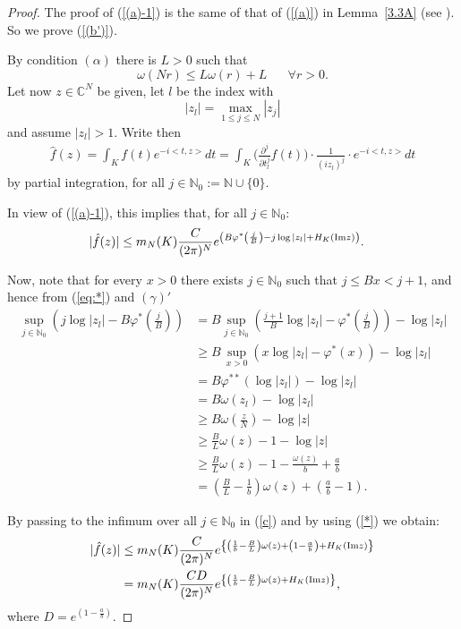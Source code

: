 \documentclass[twoside]{amsart}
\begin{document}
\begin{proof}
  The proof of (\ref{(a)-1}) is the same of that of (\ref{(a)}) in
  Lemma~\ref{3.3A} (see \cite[Lemma~3.3]{BMT}).
So we prove (\ref{(b')}).

By condition $(\alpha)$ there is $L>0$ such that 
\begin{equation}
\omega(Nr)\leq L\omega(r)+L\,\,\,\,\,\,\,\,\,\,\forall r>0.
\label{eq:*}
\end{equation}
Let now $z\in\mathbb{C}^{N}$ be given, let $l$ be the index with
\[
|z_{l}|=\underset{1\leq j\leq N}{\max}|z_{j}|
\]
and assume $|z_{l}|>1$.
Write then
\begin{align*}
\hat{f}(z) =\int_{K}f(t)e^{-i<t,z>}dt
 =\int_{K}\bigg(\frac{\partial^{j}}{\partial t_{l}^{j}}f(t)\bigg)
\cdot\frac{1}{(iz_{l})^{j}}\cdot e^{-i<t,z>}dt
\end{align*}
by partial integration, for all $j\in\mathbb{N}_{0}:={\mathbb N}\cup\{0\}$.

In view of (\ref{(a)-1}), this implies that, for all $j\in\mathbb{N}_{0}$:
\begin{align}
|\hat{f}(z)| & \leq m_{N}(K)\frac{C}{(2\pi)^{N}}
e^{\left(B\varphi^{*}\left(\frac{j}{B}\right)-j\log|z_{l}|+H_{K}({\mathop{\rm Im}\nolimits} z)\right)}.
\label{c}
\end{align}

Now, note that for every $x>0$ there exists $j\in{\mathbb N}_{0}$ such that
$j\leq Bx<j+1$, and hence from (\ref{eq:*}) and $(\gamma)'$
\begin{align}
\underset{j\in\mathbb{N}_{0}}{\sup}\left(j\log|z_{l}|-B
\varphi^{*}\left(\frac{j}{B}\right)\right) & =
B\underset{j\in\mathbb{N}_{0}}{\sup}\left(\frac{j+1}{B}
\log|z_{l}|-\varphi^{*}\left(\frac{j}{B}\right)\right)-\log|z_{l}|\nonumber \\
 & \geq B\,\underset{x>0}{\sup}\left(x\log|z_{l}|-\varphi^{*}(x)\right)-
\log|z_{l}|\nonumber \\
 & =B\varphi^{**}\left(\log|z_{l}|\right)-\log|z_{l}|\nonumber \\
 & =B\omega(z_{l})-\log|z_{l}|\nonumber \\
 & \geq B\omega\left(\frac{z}{N}\right)-\log|z|\nonumber \\
 & \geq\frac{B}{L}\omega(z)-1-\log|z|\nonumber \\
 & \geq\frac{B}{L}\omega(z)-1-\frac{\omega(z)}{b}+\frac{a}{b}\nonumber \\
 & =\left(\frac{B}{L}-\frac{1}{b}\right)\omega(z)+\left(\frac{a}{b}-1\right).
\label{*}
\end{align}

By passing to the infimum over all $j\in\mathbb{N}_{0}$ in (\ref{c})
and by using (\ref{*}) we obtain:
\begin{align*}
|\hat{f}(z)| & \leq{\displaystyle m_{N}(K)\frac{C}{(2\pi)^{N}}
e^{\left\{ \left(\frac{1}{b}-\frac{B}{L}\right)\omega(z)+\left(1-\frac{a}{b}\right)
+H_{K}({\mathop{\rm Im}\nolimits} z)\right\} }}\\
 & =m_{N}(K)\frac{CD}{(2\pi)^{N}}e^{\left\{ \left(\frac{1}{b}-\frac{B}{L}\right)
\omega(z)+H_{K}({\mathop{\rm Im}\nolimits} z)\right\} },
\end{align*}
where $D=e^{\left(1-\frac{a}{b}\right)}$.
\end{proof}
\end{document}
